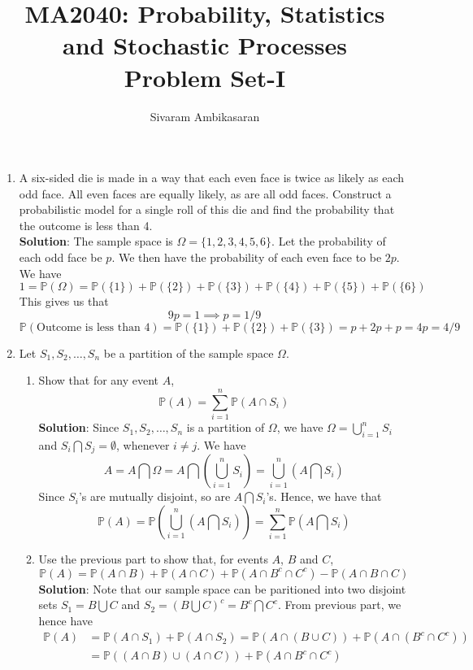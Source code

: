 \documentclass{article}
\title{MA2040: Probability, Statistics and Stochastic Processes\\
Problem Set-I}
\author{Sivaram Ambikasaran}
\newcommand{\dsum}{\displaystyle\sum}
\newcommand{\dbcup}{\displaystyle\bigcup}
\newcommand{\dbcap}{\displaystyle\bigcap}
\newcommand{\dcup}{\displaystyle\cup}
\newcommand{\dcap}{\displaystyle\cap}
\newcommand{\Pb}{\mathbb{P}}
\newcommand{\bkt}[1]{\left(#1\right)}
\newcommand{\soln}[1]{\textbf{Solution}: #1}
\begin{document}
	\maketitle
	\begin{enumerate}
		\item
		A six-sided die is made in a way that each even face is twice as likely as each odd face. All even faces are equally likely, as are all odd faces. Construct a probabilistic model for a single roll of this die and find the probability that the outcome is less than 4.\\
		\soln{The sample space is $\Omega=\{1,2,3,4,5,6\}$. Let the probability of each odd face be $p$. We then have the probability of each even face to be $2p$. We have
		$$1 = \Pb\bkt{\Omega} = \Pb\bkt{\{1\}} + \Pb\bkt{\{2\}} + \Pb\bkt{\{3\}} + \Pb\bkt{\{4\}} + \Pb\bkt{\{5\}} + \Pb\bkt{\{6\}}$$
		This gives us that
		$$9p=1 \implies p =1/9$$
		$$\Pb\bkt{\text{Outcome is less than }4} = \Pb\bkt{\{1\}} + \Pb\bkt{\{2\}} + \Pb\bkt{\{3\}} = p + 2p + p = 4p = 4/9$$
		}
		\item
		Let $S_1,S_2,\ldots,S_n$ be a partition of the sample space $\Omega$.
		\begin{enumerate}
			\item
			Show that for any event $A$,
			$$\Pb(A) = \dsum_{i=1}^n \Pb\bkt{A \dcap S_i}$$
			\soln{Since $S_1,S_2,\ldots,S_n$ is a partition of $\Omega$, we have $\Omega = \dbcup_{i=1}^n S_i$ and $S_i \dbcap S_j = \emptyset$, whenever $i \neq j$. We have
			$$A = A \dbcap \Omega = A \dbcap \bkt{\dbcup_{i=1}^n S_i} = \dbcup_{i=1}^n \bkt{A \dbcap S_i}$$
			Since $S_i$'s are mutually disjoint, so are $A \dbcap S_i$'s. Hence, we have that
			$$\Pb\bkt{A} = \Pb\bkt{\dbcup_{i=1}^n \bkt{A \dbcap S_i}} = \dsum_{i=1}^n \Pb\bkt{A \dbcap S_i}$$
			}
			\item
			Use the previous part to show that, for events $A$, $B$ and $C$,
			$$\Pb\bkt{A} = \Pb\bkt{A \dcap B} + \Pb\bkt{A \dcap C} + \Pb\bkt{A \dcap B^c \dcap C^c} - \Pb\bkt{A \dcap B \dcap C}$$
			\soln{
			Note that our sample space can be paritioned into two disjoint sets $S_1= B \dbcup C$ and $S_2 = \bkt{B \dbcup C}^c = B^c \dbcap C^c$.
			From previous part, we hence have
			\begin{align}
				\Pb\bkt{A} & = \Pb\bkt{A \dcap S_1} + \Pb\bkt{A \dcap S_2} = \Pb\bkt{A \dcap \bkt{B \dcup C}} + \Pb \bkt{A \dcap \bkt{B^c \dcap C^c}}\\
				& = \Pb\bkt{\bkt{A \dcap B} \dcup \bkt{A \dcap C}} + \Pb \bkt{A \dcap B^c \dcap C^c}\\

\end{align}}
\end{enumerate}
\end{enumerate}
\end{document}
